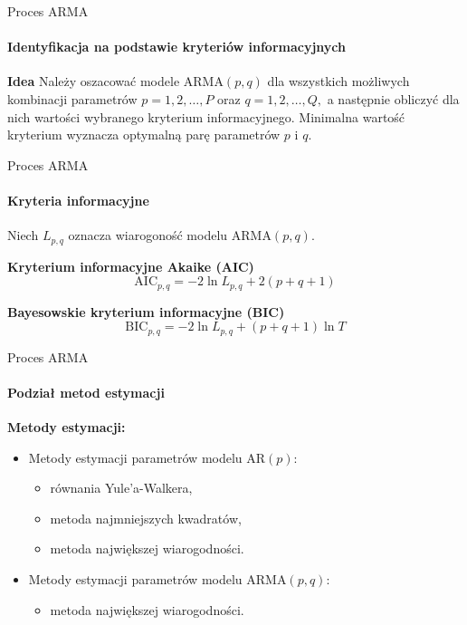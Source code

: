 \documentclass[a4paper, 11pt]{beamer}
\begin{document}
	\begin{frame}{Proces ARMA}
		\framesubtitle{Identyfikacja na podstawie kryteriów informacyjnych}
		\begin{block}{\textbf{Idea}}
			Należy oszacować modele $\mbox{ARMA}\left(p,q\right)$ dla wszystkich możliwych
			kombinacji parametrów $p=1,2,\ldots,P$ oraz $q=1,2,\ldots,Q,$ a następnie obliczyć
			dla nich wartości wybranego kryterium informacyjnego. Minimalna wartość kryterium
			wyznacza optymalną parę parametrów $p$ i $q.$
		\end{block}
	\end{frame}
	
	\begin{frame}{Proces ARMA}
		\framesubtitle{Kryteria informacyjne}
		Niech $L_{p,q}$ oznacza wiarogoność modelu $\mbox{ARMA}\left(p, q\right).$
		\begin{block}{\textbf{Kryterium informacyjne Akaike (AIC)}}
			\[
				\mbox{AIC}_{p,q} = -2\ln L_{p,q} + 2\left(p + q + 1\right)
			\]
		\end{block}
		\begin{block}{\textbf{Bayesowskie kryterium informacyjne (BIC)}}
			\[
				\mbox{BIC}_{p,q} = -2\ln L_{p,q} + \left(p + q + 1\right) \ln T
			\]
		\end{block}
	\end{frame}
	
	\begin{frame}{Proces ARMA}
		\framesubtitle{Podział metod estymacji}
		\textbf{Metody estymacji:}
		\begin{itemize}
			\item Metody estymacji parametrów modelu $\mbox{AR}\left(p\right):$
			\begin{itemize}
				\item równania Yule'a-Walkera,
				\item metoda najmniejszych kwadratów,
				\item metoda największej wiarogodności.
			\end{itemize}
			\item Metody estymacji parametrów modelu $\mbox{ARMA}\left(p,q\right):$
			\begin{itemize}
				\item metoda największej wiarogodności.
			\end{itemize}
		\end{itemize}
	\end{frame}
	
\end{document}
